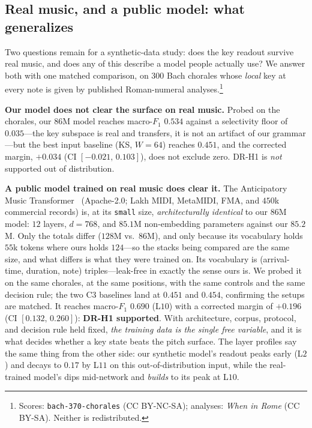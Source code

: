 \documentclass[conference]{IEEEtran}
\makeatletter
\newcommand{\vs}{vs.\@\ }
\makeatother
\begin{document}
\subsection{Real music, and a public model: what generalizes}
\label{sec:wild}
Two questions remain for a synthetic-data study: does the key readout survive real
music, and does any of this describe a model people actually use? We answer both with
one matched comparison, on $300$ Bach chorales whose \emph{local} key at every note is
given by published Roman-numeral analyses.\footnote{Scores: \texttt{bach-370-chorales}
(CC BY-NC-SA); analyses: \emph{When in Rome} (CC BY-SA). Neither is redistributed.}

\textbf{Our model does not clear the surface on real music.} Probed on the chorales, our
$86$M model reaches macro-$F_1$ $0.534$ against a selectivity floor of $0.035$---the key
subspace is real and transfers, it is not an artifact of our grammar---but the best input
baseline (KS, $W{=}64$) reaches $0.451$, and the corrected margin, $+0.034$ (CI
$[-0.021,\,0.103]$), does not exclude zero. DR-H1 is \emph{not} supported out of
distribution.

\textbf{A public model trained on real music does clear it.} The Anticipatory Music
Transformer~\cite{thickstun2023anticipatory} (Apache-2.0; Lakh MIDI, MetaMIDI, FMA, and
$450$k commercial records) is, at its \texttt{small} size, \emph{architecturally
identical} to our $86$M model: $12$ layers, $d{=}768$, and $85.1$M non-embedding
parameters against our $85.2$M. Only the totals differ ($128$M \vs $86$M), and only
because its vocabulary holds $55$k tokens where ours holds $124$---so the stacks being
compared are the same size, and what differs is what they were trained on. Its vocabulary
is (arrival-time, duration, note) triples---leak-free in exactly the sense ours is. We
probed it on the same chorales, at the same positions, with the same controls and the
same decision rule; the two C3 baselines land at $0.451$ and $0.454$, confirming the
setups are matched. It reaches macro-$F_1$ $0.690$ (L$10$) with a corrected margin of
$+0.196$ (CI $[0.132,\,0.260]$): \textbf{DR-H1 supported}. With architecture, corpus,
protocol, and decision rule held fixed, \emph{the training data is the single free
variable}, and it is what decides whether a key state beats the pitch surface. The layer
profiles say the same thing from the other side: our synthetic model's readout peaks
early (L$2$) and decays to $0.17$ by L$11$ on this out-of-distribution input, while the
real-trained model's dips mid-network and \emph{builds} to its peak at L$10$.
\end{document}
